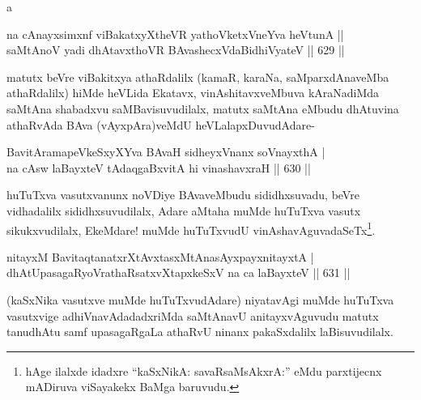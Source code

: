 
a
\begin{shl}
na cAnayxsimxnf \footnotemark[1]viBakatxyXtheVR yathoVketxVneYva heVtunA ||  \\
saMtAnoV yadi dhAtavxthoVR BAvashecxVdaBidhiVyateV \hfill||  629 ||  
\end{shl}

\begin{artha}
matutx beVre viBakitxya athaRdalilx (kamaR, karaNa, saMparxdAnaveMba athaRdalilx) hiMde heVLida Ekatavx, vinAshitavxveMbuva kAraNadiMda saMtAna shabadxvu saMBavisuvudilalx, matutx saMtAna eMbudu dhAtuvina athaRvAda BAva (vAyxpAra)veMdU heVLalapxDuvudAdare-
\end{artha}

\begin{shl}
BavitAramapeVkeSxyXYva BAvaH sidheyxVnanx soV\s nayxthA | \\
na cAsw laBayxteV tAdaqgaBxvitA hi vinashavxraH \hfill||  630 ||  
\end{shl}

\begin{artha}
huTuTxva vasutxvanunx noVDiye BAvaveMbudu sididhxsuvadu, beVre vidhadalilx sididhxsuvudilalx, Adare aMtaha muMde huTuTxva vasutx sikukxvudilalx, EkeMdare! muMde huTuTxvudU vinAshavAguvadaSeTx\footnote{hAge ilalxde idadxre ``kaSxNikA: savaRsaMsAkxrA:'' eMdu parxtijecnx mADiruva viSayakekx BaMga baruvudu.}.
\end{artha}

\begin{shl}
nitayxM BavitaqtanatxrXtAvxtasxMtAnasAyxpayxnitayxtA | \\
dhAtUpasagaRyoVrathaRsatxvXtapxkeSxV na ca laBayxteV \hfill||  631 ||  
\end{shl}

\begin{artha}
(kaSxNika vasutxve muMde huTuTxvudAdare) niyatavAgi muMde huTuTxva vasutxvige adhiVnavAdadadxriMda saMtAnavU anitayxvAguvudu matutx tanudhAtu samf upasagaRgaLa athaRvU ninanx pakaSxdalilx laBisuvudilalx.
\end{artha}


